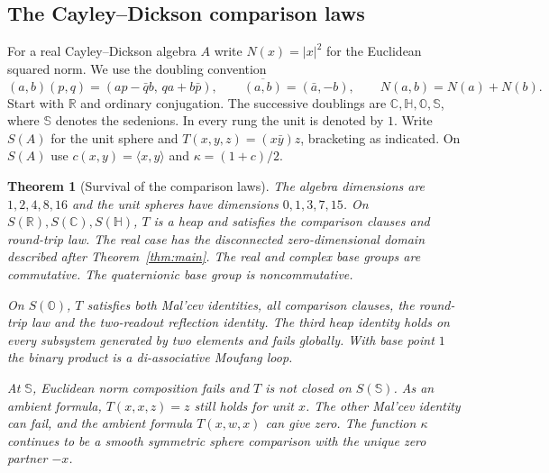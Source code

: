 \documentclass[11pt,reqno]{amsart}
\newtheorem{theorem}{Theorem}[section]
\theoremstyle{definition}
\theoremstyle{remark}
\numberwithin{equation}{section}
\newcommand{\R}{\mathbb{R}}
\newcommand{\C}{\mathbb{C}}
\newcommand{\HH}{\mathbb{H}}
\newcommand{\ip}[2]{\langle #1,#2\rangle}
\begin{document}
\subsection{The Cayley--Dickson comparison laws}

For a real Cayley--Dickson algebra \(A\) write \(N(x)=|x|^2\) for the
Euclidean squared norm. We use the doubling convention
\[
 (a,b)(p,q)=(ap-\bar q b,\,qa+b\bar p),\qquad
 \overline{(a,b)}=(\bar a,-b),\qquad
 N(a,b)=N(a)+N(b).
\]
Start with \(\R\) and ordinary conjugation. The successive doublings are
\(\C,\HH,\mathbb O,\mathbb S\), where \(\mathbb S\) denotes the
sedenions. In every rung the unit is denoted by \(1\). Write \(S(A)\)
for the unit sphere and \(T(x,y,z)=(x\bar y)z\), bracketing as indicated.
On \(S(A)\) use \(c(x,y)=\ip{x}{y}\) and \(\kappa=(1+c)/2\).

\begin{theorem}[Survival of the comparison laws]\label{m10:ladder}
The algebra dimensions are \(1,2,4,8,16\) and the unit spheres have
dimensions \(0,1,3,7,15\). On \(S(\R),S(\C),S(\HH)\), \(T\) is a heap
and satisfies the comparison clauses and round-trip law. The real
case has the disconnected zero-dimensional domain described after
Theorem~\ref{thm:main}. The real and complex base groups are
commutative. The quaternionic base group is noncommutative.

On \(S(\mathbb O)\), \(T\) satisfies both Mal'cev identities, all
comparison clauses, the round-trip law and the two-readout reflection
identity. The third heap identity holds on every subsystem generated
by two elements and fails globally. With base point \(1\) the binary
product is a di-associative Moufang loop.

At \(\mathbb S\), Euclidean norm composition fails and \(T\) is not
closed on \(S(\mathbb S)\). As an ambient formula, \(T(x,x,z)=z\)
still holds for unit \(x\). The other Mal'cev identity can fail, and
the ambient formula \(T(x,w,x)\) can give zero. The function \(\kappa\)
continues to be a smooth symmetric sphere comparison with the unique
zero partner \(-x\).
\end{theorem}
\end{document}
